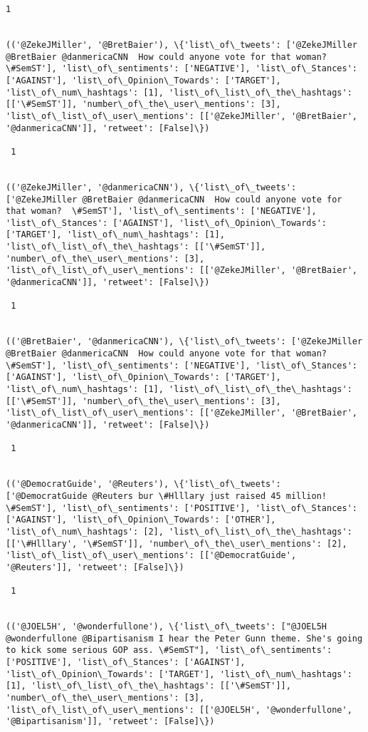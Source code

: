 \documentclass[11pt]{article}
\begin{document}
\begin{Verbatim}[commandchars=\\\{\}]
 1
 

(('@ZekeJMiller', '@BretBaier'), \{'list\_of\_tweets': ['@ZekeJMiller @BretBaier @danmericaCNN  How could anyone vote for that woman?  \#SemST'], 'list\_of\_sentiments': ['NEGATIVE'], 'list\_of\_Stances': ['AGAINST'], 'list\_of\_Opinion\_Towards': ['TARGET'], 'list\_of\_num\_hashtags': [1], 'list\_of\_list\_of\_the\_hashtags': [['\#SemST']], 'number\_of\_the\_user\_mentions': [3], 'list\_of\_list\_of\_user\_mentions': [['@ZekeJMiller', '@BretBaier', '@danmericaCNN']], 'retweet': [False]\})

 1
 

(('@ZekeJMiller', '@danmericaCNN'), \{'list\_of\_tweets': ['@ZekeJMiller @BretBaier @danmericaCNN  How could anyone vote for that woman?  \#SemST'], 'list\_of\_sentiments': ['NEGATIVE'], 'list\_of\_Stances': ['AGAINST'], 'list\_of\_Opinion\_Towards': ['TARGET'], 'list\_of\_num\_hashtags': [1], 'list\_of\_list\_of\_the\_hashtags': [['\#SemST']], 'number\_of\_the\_user\_mentions': [3], 'list\_of\_list\_of\_user\_mentions': [['@ZekeJMiller', '@BretBaier', '@danmericaCNN']], 'retweet': [False]\})

 1
 

(('@BretBaier', '@danmericaCNN'), \{'list\_of\_tweets': ['@ZekeJMiller @BretBaier @danmericaCNN  How could anyone vote for that woman?  \#SemST'], 'list\_of\_sentiments': ['NEGATIVE'], 'list\_of\_Stances': ['AGAINST'], 'list\_of\_Opinion\_Towards': ['TARGET'], 'list\_of\_num\_hashtags': [1], 'list\_of\_list\_of\_the\_hashtags': [['\#SemST']], 'number\_of\_the\_user\_mentions': [3], 'list\_of\_list\_of\_user\_mentions': [['@ZekeJMiller', '@BretBaier', '@danmericaCNN']], 'retweet': [False]\})

 1
 

(('@DemocratGuide', '@Reuters'), \{'list\_of\_tweets': ['@DemocratGuide @Reuters bur \#Hlllary just raised 45 million! \#SemST'], 'list\_of\_sentiments': ['POSITIVE'], 'list\_of\_Stances': ['AGAINST'], 'list\_of\_Opinion\_Towards': ['OTHER'], 'list\_of\_num\_hashtags': [2], 'list\_of\_list\_of\_the\_hashtags': [['\#Hlllary', '\#SemST']], 'number\_of\_the\_user\_mentions': [2], 'list\_of\_list\_of\_user\_mentions': [['@DemocratGuide', '@Reuters']], 'retweet': [False]\})

 1
 

(('@JOEL5H', '@wonderfullone'), \{'list\_of\_tweets': ["@JOEL5H @wonderfullone @Bipartisanism I hear the Peter Gunn theme. She's going to kick some serious GOP ass. \#SemST"], 'list\_of\_sentiments': ['POSITIVE'], 'list\_of\_Stances': ['AGAINST'], 'list\_of\_Opinion\_Towards': ['TARGET'], 'list\_of\_num\_hashtags': [1], 'list\_of\_list\_of\_the\_hashtags': [['\#SemST']], 'number\_of\_the\_user\_mentions': [3], 'list\_of\_list\_of\_user\_mentions': [['@JOEL5H', '@wonderfullone', '@Bipartisanism']], 'retweet': [False]\})


\end{Verbatim}
\end{document}
